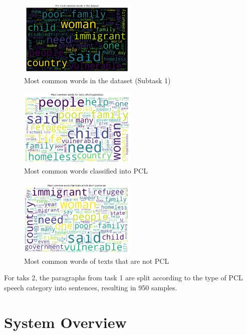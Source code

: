 \documentclass[11pt]{article}
\begin{document}
\begin{figure}[h]
	\centering
	\includegraphics[width=0.5\textwidth]{common.png}
	\caption{Most common words in the dataset (Subtask 1)}
	\label{fig2}
\end{figure}

\begin{figure}[h]
	\centering
	\includegraphics[width=0.5\textwidth]{pcl.png}
	\caption{Most common words classified into PCL}
	\label{fig3}
\end{figure}

\begin{figure}[h]
	\centering
	\includegraphics[width=0.5\textwidth]{nopcl.png}
	\caption{Most common words of texts that are not PCL}
	\label{fig4}
\end{figure}


For taks 2, the paragraphs from task 1 are split according to the type of PCL speech category into sentences, resulting in 950 samples.

\section{System Overview}
\end{document}
